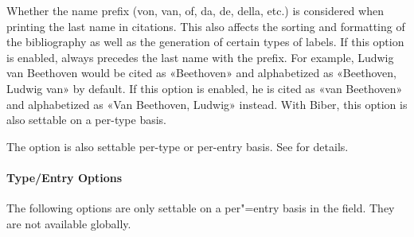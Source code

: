 \documentclass{ltxdockit}[2011/03/25]
\newcommand*{\biber}{Biber\xspace}
\begin{document}
\begin{optionlist}

Whether the name prefix (von, van, of, da, de, della, etc.) is considered when printing the last name in citations. This also affects the sorting and formatting of the bibliography as well as the generation of certain types of labels. If this option is enabled,  always precedes the last name with the prefix. For example, Ludwig van Beethoven would be cited as «Beethoven» and alphabetized as «Beethoven, Ludwig van» by default. If this option is enabled, he is cited as «van Beethoven» and alphabetized as «Van Beethoven, Ludwig» instead.
\BiberOnlyMark With \biber, this option is also settable on a per-type basis.


The  option is also settable per-type or per-entry basis. See  for details.

\end{optionlist}

\paragraph{Type/Entry Options}
\label{use:opt:bib:ded}

The following options are only settable on a per"=entry basis in the  field. They are not available globally.
\end{document}
